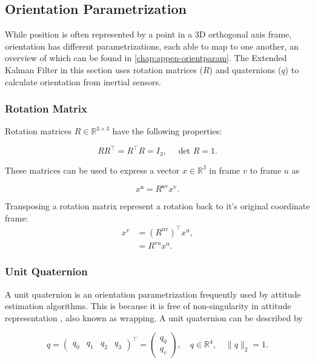 \subsection{Orientation Parametrization}
While position is often represented by a point in a 3D orthogonal axis frame, orientation has different parametrizations, each able to map to one another, an overview of which can be found in \cref{chap:appen-orientparam}. The Extended Kalman Filter in this section uses rotation matrices ($R$) and quaternions ($q$) to calculate orientation from inertial sensors.

\subsubsection{Rotation Matrix}
Rotation matrices $R \in \mathbb{R}^{3 \times 3}$ have the following properties:

\begin{equation}
	\label{eq:rot_mat_properties}
	R R^{\top}=R^{\top} R=I_{3}, \quad \text { det } R=1.
\end{equation}

These matrices can be used to express a vector $x \in \mathbb{R}^{3}$ in frame $v$ to frame $u$ as 

\begin{equation}
	\label{eq:rot_mat_rot_x}
	x^{\mathfrak{u}}=R^{\mathfrak{u} \mathrm{v}} x^{\mathrm{v}}.
\end{equation}

Transposing a rotation matrix represent a rotation back to it's original coordinate frame:
\begin{subequations}
	\begin{align}
		\label{eq:rot_mat_trans}
		x^{\mathrm{v}}&=\left(R^{\mathrm{uv}}\right)^{\top} x^{\mathrm{u}},\\
		&=R^{\mathrm{vu}} x^{\mathrm{u}}.
	\end{align}
\end{subequations}

\subsubsection{Unit Quaternion}
A unit quaternion is an orientation parametrization frequently used by attitude estimation algorithms. This is because it is free of non-singularity in attitude representation \cite{Hashim2019}, also known as wrapping. A unit quaternion can be described by

\begin{equation}
	\label{eq:unit_quarternion}
	q=\left(\begin{array}{llll}{q_{0}} & {q_{1}} & {q_{2}} & {q_{3}}\end{array}\right)^{\top}
	=\left(\begin{array}{l}{q_{0}} \\ {q_{v}}\end{array}\right), 
	\quad q \in \mathbb{R}^{4}, 
	\quad\|q\|_{2}=1.
\end{equation}

